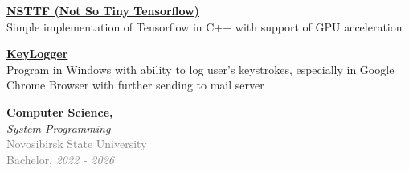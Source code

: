 \documentclass[10pt, a4paper]{article}
\begin{document}
\begin{minipage}[t]{0.6\textwidth}
\vspace{0.5cm}

\hspace{0.5cm}
\begin{minipage}[t]{0.9\textwidth}
    \textbf{\Large \href{https://github.com/VolkovK04/NSTTF}{NSTTF (Not So Tiny Tensorflow)}} \extlink \\[2pt]
    Simple implementation of Tensorflow in C++ with support of GPU acceleration \\
\end{minipage}

\vspace{0.5cm}

\hspace{0.5cm}
\begin{minipage}[t]{0.9\textwidth}
    \textbf{\Large \href{https://github.com/Isn0v/KeyLogger}{KeyLogger}} \extlink \\[2pt]
    Program in Windows with ability to log user's keystrokes, especially in Google Chrome Browser with further sending to mail server \\
\end{minipage}


\vspace{1cm}


\hspace{0.5cm}
\begin{minipage}[t]{0.9\textwidth}
    \textbf{\Large Computer Science,} \\[2pt]
    \textit{\large System Programming} \\[4pt]
    \textcolor{graytext}{Novosibirsk State University} \\
    \textcolor{graytext}{Bachelor, \textit{2022 - 2026}}
\end{minipage}


\end{minipage}%
\end{document}
